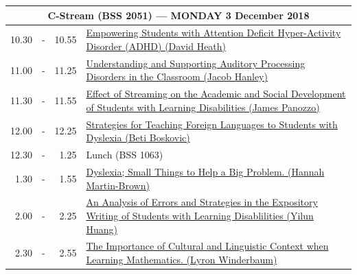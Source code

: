 \documentclass[twoside,12pt,a4paper,notitlepage]{memoir}
\begin{document}
\begin{center}
\begin{tabular}{rcr|p{10.8cm}}
 \multicolumn{4}{c}{{\large C-Stream (BSS 2051) --- MONDAY 3 December 2018}} \\ \hline
 10.30 & - & 10.55 & 
 \hyperref[aut:heath]{Empowering Students with Attention Deficit Hyper-Activity Disorder (ADHD) (David Heath)} \\ \hline
11.00 & - & 11.25 &
 \hyperref[aut:hanley]{Understanding and Supporting Auditory Processing Disorders in the Classroom (Jacob Hanley)} \\ \hline
11.30 & - & 11.55 &
 \hyperref[aut:panozzo]{Effect of Streaming on the Academic and Social Development of Students with Learning Disabilities (James Panozzo)} \\ \hline
12.00 & - & 12.25 &
 \hyperref[aut:boskovic]{Strategies for Teaching Foreign Languages to Students with Dyslexia (Beti Boskovic)} \\ \hline
12.30 & - & 1.25 & Lunch (BSS 1063) \\ \hline
1.30 & - & 1.55 &
 \hyperref[aut:brown]{Dyslexia; Small Things to Help a Big Problem. (Hannah Martin-Brown)} \\ \hline
2.00 & - & 2.25 &
 \hyperref[aut:huang]{An Analysis of Errors and Strategies in the Expository Writing of Students with Learning Disablilities (Yilun Huang)} \\ \hline
2.30 & - & 2.55 &
 \hyperref[aut:winderbaum]{The Importance of Cultural and Linguistic Context when Learning Mathematics. (Lyron Winderbaum)} \\ \hline
\end{tabular}
\end{center}
\end{document}

